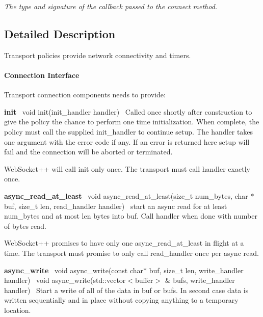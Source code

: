 \begin{DoxyCompactItemize}
\begin{DoxyCompactList}\small\item\em The type and signature of the callback passed to the connect method. \end{DoxyCompactList}\end{DoxyCompactItemize}


\subsection{Detailed Description}
Transport policies provide network connectivity and timers. 

\paragraph*{Connection Interface}

Transport connection components needs to provide\+:

{\bfseries init}~\newline
{\ttfamily void init(init\+\_\+handler handler)}~\newline
Called once shortly after construction to give the policy the chance to perform one time initialization. When complete, the policy must call the supplied {\ttfamily init\+\_\+handler} to continue setup. The handler takes one argument with the error code if any. If an error is returned here setup will fail and the connection will be aborted or terminated.

Web\+Socket++ will call init only once. The transport must call {\ttfamily handler} exactly once.

{\bfseries async\+\_\+read\+\_\+at\+\_\+least}~\newline
{\ttfamily void async\+\_\+read\+\_\+at\+\_\+least(size\+\_\+t num\+\_\+bytes, char $\ast$buf, size\+\_\+t len, read\+\_\+handler handler)}~\newline
start an async read for at least num\+\_\+bytes and at most len bytes into buf. Call handler when done with number of bytes read.

Web\+Socket++ promises to have only one async\+\_\+read\+\_\+at\+\_\+least in flight at a time. The transport must promise to only call read\+\_\+handler once per async read.

{\bfseries async\+\_\+write}~\newline
{\ttfamily void async\+\_\+write(const char$\ast$ buf, size\+\_\+t len, write\+\_\+handler handler)}~\newline
{\ttfamily void async\+\_\+write(std\+::vector$<$buffer$>$ \& bufs, write\+\_\+handler handler)}~\newline
Start a write of all of the data in buf or bufs. In second case data is written sequentially and in place without copying anything to a temporary location.


